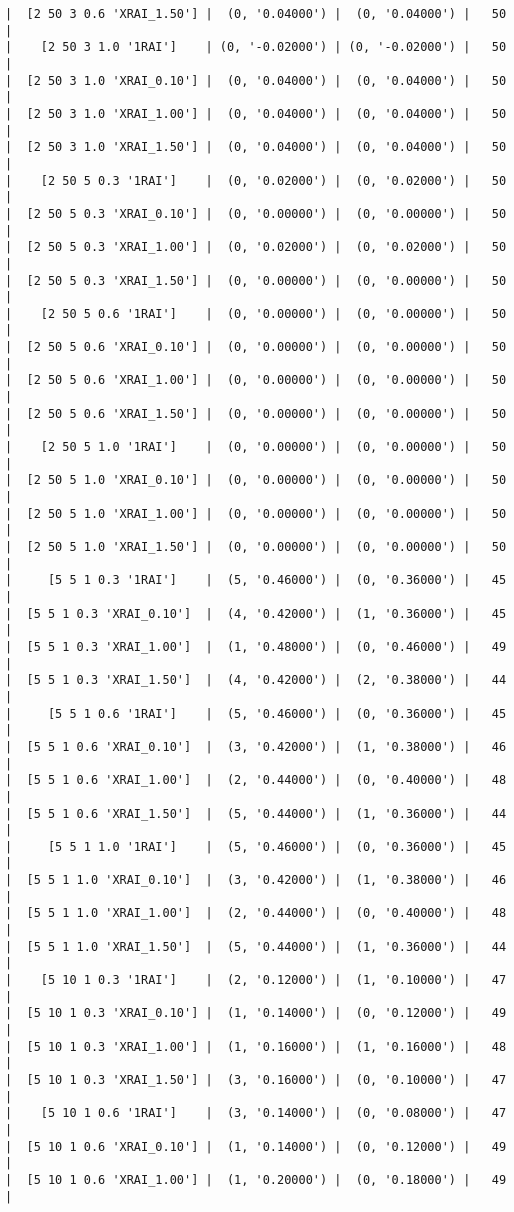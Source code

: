 \documentclass{article}
\begin{document}
\begin{verbatim}
|  [2 50 3 0.6 'XRAI_1.50'] |  (0, '0.04000') |  (0, '0.04000') |   50  |
|    [2 50 3 1.0 '1RAI']    | (0, '-0.02000') | (0, '-0.02000') |   50  |
|  [2 50 3 1.0 'XRAI_0.10'] |  (0, '0.04000') |  (0, '0.04000') |   50  |
|  [2 50 3 1.0 'XRAI_1.00'] |  (0, '0.04000') |  (0, '0.04000') |   50  |
|  [2 50 3 1.0 'XRAI_1.50'] |  (0, '0.04000') |  (0, '0.04000') |   50  |
|    [2 50 5 0.3 '1RAI']    |  (0, '0.02000') |  (0, '0.02000') |   50  |
|  [2 50 5 0.3 'XRAI_0.10'] |  (0, '0.00000') |  (0, '0.00000') |   50  |
|  [2 50 5 0.3 'XRAI_1.00'] |  (0, '0.02000') |  (0, '0.02000') |   50  |
|  [2 50 5 0.3 'XRAI_1.50'] |  (0, '0.00000') |  (0, '0.00000') |   50  |
|    [2 50 5 0.6 '1RAI']    |  (0, '0.00000') |  (0, '0.00000') |   50  |
|  [2 50 5 0.6 'XRAI_0.10'] |  (0, '0.00000') |  (0, '0.00000') |   50  |
|  [2 50 5 0.6 'XRAI_1.00'] |  (0, '0.00000') |  (0, '0.00000') |   50  |
|  [2 50 5 0.6 'XRAI_1.50'] |  (0, '0.00000') |  (0, '0.00000') |   50  |
|    [2 50 5 1.0 '1RAI']    |  (0, '0.00000') |  (0, '0.00000') |   50  |
|  [2 50 5 1.0 'XRAI_0.10'] |  (0, '0.00000') |  (0, '0.00000') |   50  |
|  [2 50 5 1.0 'XRAI_1.00'] |  (0, '0.00000') |  (0, '0.00000') |   50  |
|  [2 50 5 1.0 'XRAI_1.50'] |  (0, '0.00000') |  (0, '0.00000') |   50  |
|     [5 5 1 0.3 '1RAI']    |  (5, '0.46000') |  (0, '0.36000') |   45  |
|  [5 5 1 0.3 'XRAI_0.10']  |  (4, '0.42000') |  (1, '0.36000') |   45  |
|  [5 5 1 0.3 'XRAI_1.00']  |  (1, '0.48000') |  (0, '0.46000') |   49  |
|  [5 5 1 0.3 'XRAI_1.50']  |  (4, '0.42000') |  (2, '0.38000') |   44  |
|     [5 5 1 0.6 '1RAI']    |  (5, '0.46000') |  (0, '0.36000') |   45  |
|  [5 5 1 0.6 'XRAI_0.10']  |  (3, '0.42000') |  (1, '0.38000') |   46  |
|  [5 5 1 0.6 'XRAI_1.00']  |  (2, '0.44000') |  (0, '0.40000') |   48  |
|  [5 5 1 0.6 'XRAI_1.50']  |  (5, '0.44000') |  (1, '0.36000') |   44  |
|     [5 5 1 1.0 '1RAI']    |  (5, '0.46000') |  (0, '0.36000') |   45  |
|  [5 5 1 1.0 'XRAI_0.10']  |  (3, '0.42000') |  (1, '0.38000') |   46  |
|  [5 5 1 1.0 'XRAI_1.00']  |  (2, '0.44000') |  (0, '0.40000') |   48  |
|  [5 5 1 1.0 'XRAI_1.50']  |  (5, '0.44000') |  (1, '0.36000') |   44  |
|    [5 10 1 0.3 '1RAI']    |  (2, '0.12000') |  (1, '0.10000') |   47  |
|  [5 10 1 0.3 'XRAI_0.10'] |  (1, '0.14000') |  (0, '0.12000') |   49  |
|  [5 10 1 0.3 'XRAI_1.00'] |  (1, '0.16000') |  (1, '0.16000') |   48  |
|  [5 10 1 0.3 'XRAI_1.50'] |  (3, '0.16000') |  (0, '0.10000') |   47  |
|    [5 10 1 0.6 '1RAI']    |  (3, '0.14000') |  (0, '0.08000') |   47  |
|  [5 10 1 0.6 'XRAI_0.10'] |  (1, '0.14000') |  (0, '0.12000') |   49  |
|  [5 10 1 0.6 'XRAI_1.00'] |  (1, '0.20000') |  (0, '0.18000') |   49  |

\end{verbatim}
\end{document}
